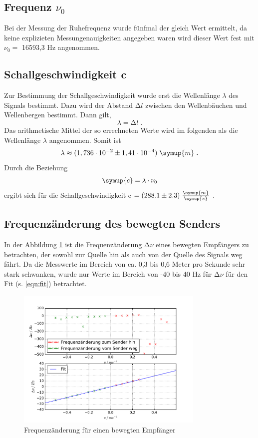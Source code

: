 \subsection{Frequenz \texorpdfstring{$\nu_0$}{[math]}}
Bei der Messung der Ruhefrequenz wurde fünfmal der gleich Wert ermittelt, da
keine explizieten Messungenauigkeiten angegeben waren wird dieser Wert fest
mit $\nu_0 = $ 16593,3 Hz angenommen.
\subsection{Schallgeschwindigkeit c}
Zur Bestimmung der Schallgeschwindigkeit wurde erst die Wellenlänge $\lambda$ des Signals
bestimmt. Dazu wird der Abstand $\increment l$ zwischen den Wellenbäuchen und Wellenbergen
bestimmt. Dann gilt,
\begin{equation*}
  \lambda = \increment l \;.
\end{equation*}
Das arithmetische Mittel der so errechneten Werte wird im folgenden als die
Wellenlänge $\lambda$ angenommen. Somit ist
\begin{equation*}
  \lambda \approx (1,736\cdot 10^{-2} \pm 1,41\cdot10^{-4})\;\symup{m}\; .
\end{equation*}
Durch die Beziehung
\begin{equation*}
  \symup{c} = \lambda \cdot \nu_0
\end{equation*}
ergibt sich für die Schallgeschwindigkeit c $ = (288.1 \pm 2.3)\;
 \frac{\symup{m}}{\symup{s}}$ .
\subsection{Frequenzänderung des bewegten Senders}
In der Abbildung \ref{fig:d} ist die Frequenzänderung $\increment \nu$ eines
bewegten Empfängers zu betrachten, der sowohl zur Quelle hin als auch von der
Quelle des Signals weg fährt. Da die Messwerte im Bereich von ca. 0,3 bis 0,6
Meter pro Sekunde sehr stark schwanken, wurde nur Werte im Bereich von -40 bis
40 Hz für $\increment \nu $ für den Fit (s. \eqref{eqn:fit}) betrachtet.
\begin{figure}
  \centering
  \includegraphics[width=0.8\textwidth]{plots/dplot.pdf}
  \caption{Frequenzänderung für einen bewegten Empfänger}
  \label{fig:d}
\end{figure}
\FloatBarrier



